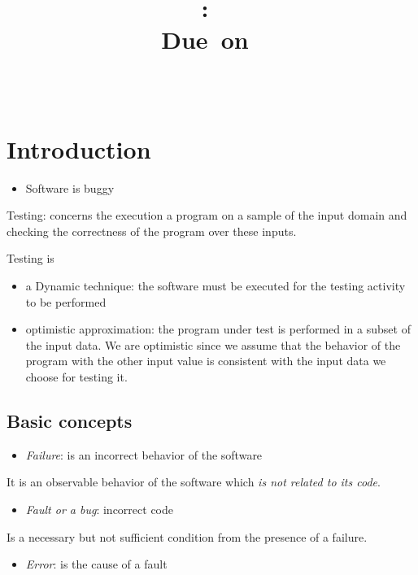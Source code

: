 \documentclass{article}
\title{
\vspace{2in}
\textmd{\textbf{\hmwkClass:\ \hmwkTitle}}\\
\normalsize\vspace{0.1in}\small{Due\ on\ \hmwkDueDate}\\
\vspace{0.1in}\large{\textit{\hmwkClassInstructor\ \hmwkClassTime}}
\vspace{3in}
}
\author{\textbf{\hmwkAuthorName}}
\date{} %
\begin{document}
\maketitle



\newpage
\tableofcontents
\newpage



\section{Introduction}
\begin{itemize}
\item Software is buggy
\end{itemize}
Testing: concerns the execution a program on a sample of the input domain and checking the correctness of the program over these inputs.

Testing is 
\begin{itemize}
\item a Dynamic technique: the software must be executed for the testing activity to be performed
\item optimistic approximation: the program under test is performed in a subset of the input data. We are optimistic since we assume that the behavior of the program with the other input value is consistent with the input data we choose for testing it.
\end{itemize}
\subsection{Basic concepts}

\begin{itemize}
\item \emph{Failure}: is an incorrect behavior of the software
\end{itemize}
It is an observable behavior of the software which \emph{is not related to its code}.
\begin{itemize}
\item \emph{Fault or a bug}: incorrect code 
\end{itemize}
Is a necessary but not sufficient condition from the presence of a failure.
\begin{itemize}
\item \emph{Error}: is the cause of a fault
\end{itemize}
\end{document}
